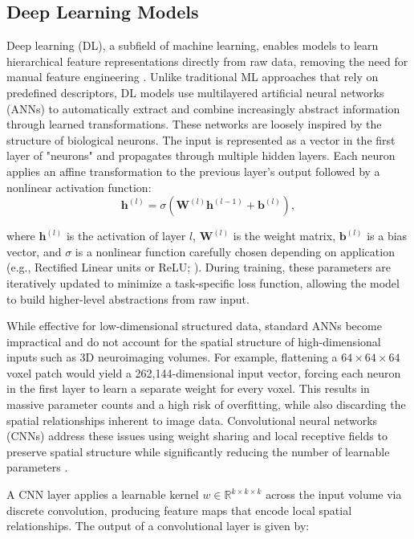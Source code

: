 \subsection{Deep Learning Models}
\label{sec:deeplearning}
Deep learning (DL), a subfield of machine learning, enables models to learn hierarchical feature representations directly from raw data, removing the need for manual feature engineering \cite{LeCun2015-da, Sarker2021-fo}. Unlike traditional ML approaches that rely on predefined descriptors, DL models use multilayered artificial neural networks (ANNs) to automatically extract and combine increasingly abstract information through learned transformations. These networks are loosely inspired by the structure of biological neurons. The input is represented as a vector in the first layer of "neurons" and propagates through multiple hidden layers. Each neuron applies an affine transformation to the previous layer’s output followed by a nonlinear activation function:
\begin{equation}
    \mathbf{h}^{(l)} = \sigma\left( \mathbf{W}^{(l)} \mathbf{h}^{(l-1)} + \mathbf{b}^{(l)} \right),
\end{equation}

where $\mathbf{h}^{(l)}$ is the activation of layer $l$, $\mathbf{W}^{(l)}$ is the weight matrix, $\mathbf{b}^{(l)}$ is a bias vector, and $\sigma$ is a nonlinear function carefully chosen depending on application (e.g., Rectified Linear units or ReLU; \cite{Agarap2018-vg}). During training, these parameters are iteratively updated to minimize a task-specific loss function, allowing the model to build higher-level abstractions from raw input.

While effective for low-dimensional structured data, standard ANNs become impractical and do not account for the spatial structure of high-dimensional inputs such as 3D neuroimaging volumes. For example, flattening a \(64 \times 64 \times 64\) voxel patch would yield a 262,144-dimensional input vector, forcing each neuron in the first layer to learn a separate weight for every voxel. This results in massive parameter counts and a high risk of overfitting, while also discarding the spatial relationships inherent to image data. Convolutional neural networks (CNNs) address these issues using weight sharing and local receptive fields to preserve spatial structure while significantly reducing the number of learnable parameters \cite{LeCun2015-da,Indolia2018-vu}.

A CNN layer applies a learnable kernel \( w \in \mathbb{R}^{k \times k \times k} \) across the input volume via discrete convolution, producing feature maps that encode local spatial relationships. The output of a convolutional layer is given by:

